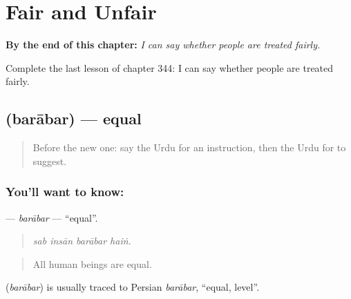
\chapter{Fair and Unfair}
\label{ch:ur-fair-and-unfair}

\begin{chapteropening}
\textbf{By the end of this chapter:} \emph{I can say whether people are treated fairly.}

Complete the last lesson of chapter 344: I can say whether people are treated fairly.
\end{chapteropening}

\section[\texorpdfstring{\ur{برابر} (barābar)}{برابر (barābar)}]{ (barābar) — equal}

\label{lesson:UR-C344-barabar}



\begin{quote}
Before the new one: say the Urdu for an instruction, then the Urdu for to suggest.
\end{quote}

\subsection*{You'll want to know: }
\textbf{} — \emph{barābar} — \textquotedblleft{}equal\textquotedblright{}.

\begin{quote}
   
\end{quote}

\begin{quote}
\emph{sab insān barābar haiṅ.}
\end{quote}

\begin{quote}
All human beings are equal.
\end{quote}

\begin{cousinweb}
\textbf{} (\emph{barābar}) is usually traced to Persian \emph{barābar}, \textquotedblleft{}equal, level\textquotedblright{}.
\end{cousinweb}

